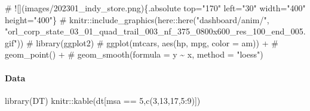 \documentclass[
  letterpaper,
  DIV=11,
  numbers=noendperiod]{scrartcl}
\let\oldparagraph\paragraph
\renewcommand{\paragraph}[1]{\oldparagraph{#1}\mbox{}}
\newenvironment{Shaded}{\begin{snugshade}}{\end{snugshade}}
\newcommand{\CommentTok}[1]{\textcolor[rgb]{0.37,0.37,0.37}{#1}}
\newcommand{\DecValTok}[1]{\textcolor[rgb]{0.68,0.00,0.00}{#1}}
\newcommand{\FunctionTok}[1]{\textcolor[rgb]{0.28,0.35,0.67}{#1}}
\newcommand{\NormalTok}[1]{\textcolor[rgb]{0.00,0.23,0.31}{#1}}
\newcommand{\SpecialCharTok}[1]{\textcolor[rgb]{0.37,0.37,0.37}{#1}}
\begin{document}
\begin{Shaded}
\begin{Highlighting}[]
\CommentTok{\# ![](images/202301\_indy\_store.png)\{.absolute top="170" left="30" width="400" height="400"\}}
\CommentTok{\# knitr::include\_graphics(here::here("dashboard/anim/", "orl\_corp\_state\_03\_01\_quad\_trail\_003\_nf\_375\_0800x600\_res\_100\_end\_005.gif"))}
\CommentTok{\# library(ggplot2)}
\CommentTok{\# ggplot(mtcars, aes(hp, mpg, color = am)) +}
\CommentTok{\#  geom\_point() +}
\CommentTok{\#  geom\_smooth(formula = y \textasciitilde{} x, method = "loess")}
\end{Highlighting}
\end{Shaded}

\hypertarget{data}{%
\paragraph{Data}\label{data}}

\begin{Shaded}
\begin{Highlighting}[]
\FunctionTok{library}\NormalTok{(DT)}
\NormalTok{knitr}\SpecialCharTok{::}\FunctionTok{kable}\NormalTok{(dt[msa }\SpecialCharTok{==} \DecValTok{5}\NormalTok{,}\FunctionTok{c}\NormalTok{(}\DecValTok{3}\NormalTok{,}\DecValTok{13}\NormalTok{,}\DecValTok{17}\NormalTok{,}\DecValTok{5}\SpecialCharTok{:}\DecValTok{9}\NormalTok{)])}
\end{Highlighting}
\end{Shaded}
\end{document}
